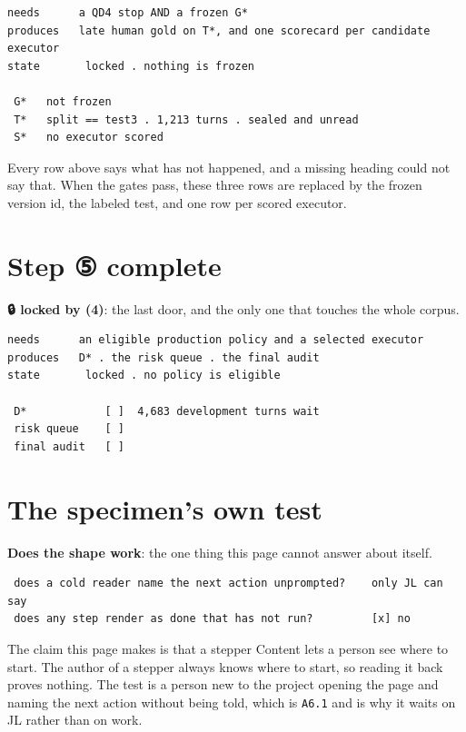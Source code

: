 \begin{verbatim}
needs      a QD4 stop AND a frozen G*
produces   late human gold on T*, and one scorecard per candidate executor
state       locked . nothing is frozen

 G*   not frozen
 T*   split == test3 . 1,213 turns . sealed and unread
 S*   no executor scored
\end{verbatim}
Every row above says what has not happened, and a missing heading could not say that. When the gates pass, these three rows are replaced by the frozen version id, the labeled test, and one row per scored executor.


\section{Step ⑤ complete}
\textbf{🔒 locked by (4)}: the last door, and the only one that touches the whole corpus.

\begin{verbatim}
needs      an eligible production policy and a selected executor
produces   D* . the risk queue . the final audit
state       locked . no policy is eligible

 D*            [ ]  4,683 development turns wait
 risk queue    [ ]
 final audit   [ ]
\end{verbatim}

\section{The specimen's own test}
\textbf{Does the shape work}: the one thing this page cannot answer about itself.

\begin{verbatim}
 does a cold reader name the next action unprompted?    only JL can say
 does any step render as done that has not run?         [x] no
\end{verbatim}
The claim this page makes is that a stepper Content lets a person see where to start. The author of a stepper always knows where to start, so reading it back proves nothing. The test is a person new to the project opening the page and naming the next action without being told, which is \texttt{A6.1} and is why it waits on JL rather than on work.

